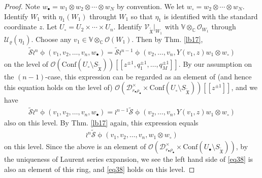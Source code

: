 \documentclass[12pt,a4paper,notitlepage]{article}
\theoremstyle{definition}
\theoremstyle{plain}
\newcommand{\fk}{\mathfrak}
\newcommand{\mc}{\mathcal}
\newcommand{\wtd}{\widetilde}
\newcommand{\Conf}{\mathrm{Conf}}
\newcommand{\scr}{\mathscr}
\newcommand{\blt}{\bullet}
\newcommand{\Vbb}{\mathbb V}
\newcommand{\Cbb}{\mathbb C}
\newcommand{\SXtd}{S_{\wtd{\fk X}}}
\numberwithin{equation}{section}
\begin{document}
\begin{proof}
Note $w_\blt=w_1\otimes w_2\otimes\cdots\otimes w_N$ by convention. We let $w_\circ=w_2\otimes\cdots \otimes w_N$. Identify $W_1$ with $\eta_1(W_1)$ throught $W_1$ so that $\eta_1$ is identified with the standard coordinate $z$. Let $U_\circ=U_2\times\cdots\times U_n$. Identify $\scr V_{\wtd{\fk X}}|_{W_1}$ with $\Vbb\otimes_\Cbb\scr O_{W_1}$ through $\mc U_\varrho(\eta_1)$. Choose any $v_1\in\Vbb\otimes_\Cbb\scr O(W_1)$. Then by Thm. \ref{lb17},
\begin{align*}
\wtd{\mc S}\wr^n\upphi(v_1,v_2,\dots,v_n,w_\blt)=\wtd{\mc S}\wr^{n-1}\upphi(v_2,\dots,v_n,Y(v_1,z)w_1\otimes w_\circ)	
\end{align*}
on the level of $\scr O(\Conf(U_\circ\setminus\SXtd))[[z^{\pm 1},q_1^{\pm1},\dots,q_M^{\pm1}]]$. By our assumption on the $(n-1)$-case, this expression can be regarded as an element of (and hence this equation holds on the level of) $\scr O(\mc D_{r_\blt\rho_\blt}^\times\times\Conf(U_\circ\setminus\SXtd))[[z^{\pm 1}]]$, and we have
\begin{align*}
\wtd{\mc S}\wr^n\upphi(v_1,v_2,\dots,v_n,w_\blt)=\wr^{n-1}\wtd{\mc S}\upphi(v_2,\dots,v_n,Y(v_1,z)w_1\otimes w_\circ)	
\end{align*}
also on this level. By Thm. \ref{lb17} again, this expression equals
\begin{align*}
\wr^n\wtd{\mc S}\upphi(v_1,v_2,\dots,v_n,w_1\otimes w_\circ)	
\end{align*}
on this level. Since the above is an element of $\scr O(\mc D_{r_\blt\rho_\blt}^\times\times\Conf(U_\blt\setminus\SXtd))$, by the uniqueness of Laurent series expansion, we see the left hand side of \eqref{eq38} is also an element of this ring, and \eqref{eq38} holds on this level.
\end{proof}
\end{document}
